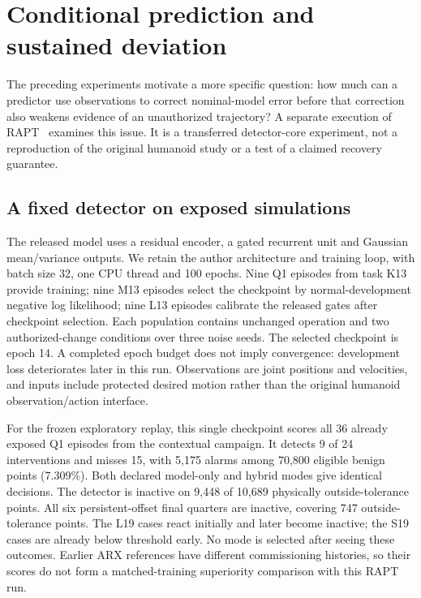 \section{Conditional prediction and sustained deviation}\label{sec:conditional}
The preceding experiments motivate a more specific question: how much can a predictor use observations to correct nominal-model error before that correction also weakens evidence of an unauthorized trajectory? A separate execution of RAPT~\cite{rapt} examines this issue. It is a transferred detector-core experiment, not a reproduction of the original humanoid study or a test of a claimed recovery guarantee.

\subsection{A fixed detector on exposed simulations}
The released model uses a residual encoder, a gated recurrent unit and Gaussian mean/variance outputs. We retain the author architecture and training loop, with batch size 32, one CPU thread and 100 epochs. Nine Q1 episodes from task K13 provide training; nine M13 episodes select the checkpoint by normal-development negative log likelihood; nine L13 episodes calibrate the released gates after checkpoint selection. Each population contains unchanged operation and two authorized-change conditions over three noise seeds. The selected checkpoint is epoch 14. A completed epoch budget does not imply convergence: development loss deteriorates later in this run. Observations are joint positions and velocities, and inputs include protected desired motion rather than the original humanoid observation/action interface.

For the frozen exploratory replay, this single checkpoint scores all 36 already exposed Q1 episodes from the contextual campaign. It detects 9 of 24 interventions and misses 15, with 5,175 alarms among 70,800 eligible benign points (7.309\%). Both declared model-only and hybrid modes give identical decisions. The detector is inactive on 9,448 of 10,689 physically outside-tolerance points. All six persistent-offset final quarters are inactive, covering 747 outside-tolerance points. The L19 cases react initially and later become inactive; the S19 cases are already below threshold early. No mode is selected after seeing these outcomes. Earlier ARX references have different commissioning histories, so their scores do not form a matched-training superiority comparison with this RAPT run.


